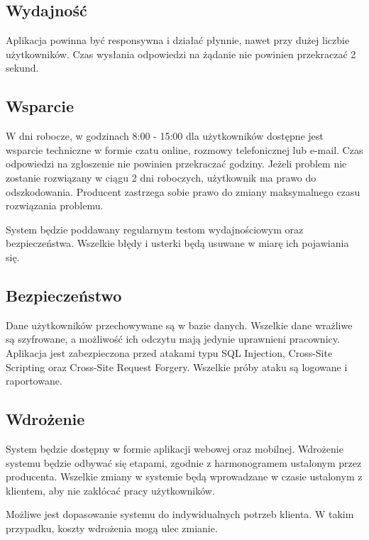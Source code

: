 \subsection{Wydajność}

Aplikacja powinna być responsywna i działać płynnie, nawet przy dużej liczbie użytkowników. Czas wysłania odpowiedzi na żądanie nie powinien przekraczać 2 sekund.

\subsection{Wsparcie}

W dni robocze, w godzinach 8:00 - 15:00 dla użytkowników dostępne jest wsparcie techniczne w formie czatu online, rozmowy telefonicznej lub e-mail. Czas odpowiedzi na zgłoszenie nie powinien przekraczać godziny. Jeżeli problem nie zostanie rozwiązany w ciągu 2 dni roboczych, użytkownik ma prawo do odszkodowania. Producent zastrzega sobie prawo do zmiany maksymalnego czasu rozwiązania problemu.

System będzie poddawany regularnym testom wydajnościowym oraz bezpieczeństwa. Wszelkie błędy i usterki będą usuwane w miarę ich pojawiania się.

\subsection{Bezpieczeństwo}

Dane użytkowników przechowywane są w bazie danych. Wszelkie dane wrażliwe są szyfrowane, a możliwość ich odczytu mają jedynie uprawnieni pracownicy. Aplikacja jest zabezpieczona przed atakami typu SQL Injection, Cross-Site Scripting oraz Cross-Site Request Forgery. Wszelkie próby ataku są logowane i raportowane.

\subsection{Wdrożenie}

System będzie dostępny w formie aplikacji webowej oraz mobilnej. Wdrożenie systemu będzie odbywać się etapami, zgodnie z harmonogramem ustalonym przez producenta. Wszelkie zmiany w systemie będą wprowadzane w czasie ustalonym z klientem, aby nie zakłócać pracy użytkowników.

Możliwe jest dopasowanie systemu do indywidualnych potrzeb klienta. W takim przypadku, koszty wdrożenia mogą ulec zmianie.

